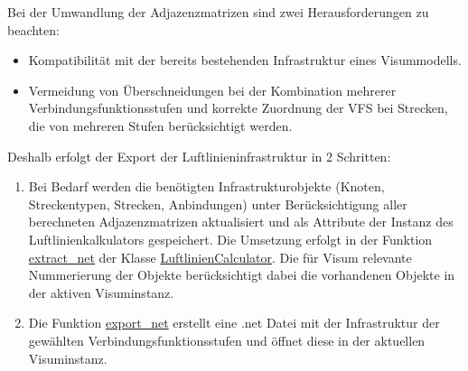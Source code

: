 Bei der Umwandlung der Adjazenzmatrizen sind zwei Herausforderungen zu beachten:
\begin{itemize}
\item Kompatibilität mit der bereits bestehenden Infrastruktur eines Visummodells.
\item Vermeidung von Überschneidungen bei der Kombination mehrerer Verbindungsfunktionsstufen und korrekte Zuordnung der VFS bei Strecken, die von mehreren Stufen berücksichtigt werden.
\end{itemize}
Deshalb erfolgt der Export der Luftlinieninfrastruktur in 2 Schritten:
\begin{enumerate}
\item Bei Bedarf werden die benötigten Infrastrukturobjekte (Knoten, Streckentypen, Strecken, Anbindungen) unter Berücksichtigung aller berechneten Adjazenzmatrizen aktualisiert und als Attribute der Instanz des Luftlinienkalkulators gespeichert.
Die Umsetzung erfolgt in der Funktion \mbox{\hyperlink{classluftlinientool_1_1_luftlinien_calculator_ae484ccaf33905de92dcc38f3e6f449b7}{extract\+\_\+net}}  der Klasse \mbox{\hyperlink{classluftlinientool_1_1_luftlinien_calculator}{Luftlinien\+Calculator}}.
Die für Visum relevante Nummerierung der Objekte berücksichtigt dabei die vorhandenen Objekte in der aktiven Visuminstanz.
\item Die Funktion \mbox{\hyperlink{classluftlinientool_1_1_luftlinien_calculator_a859aba6233379faafd878b66d51b280c}{export\+\_\+net}} erstellt eine .net Datei mit der Infrastruktur der gewählten Verbindungsfunktionsstufen und öffnet diese in der aktuellen Visuminstanz.
\end{enumerate}

%
%


